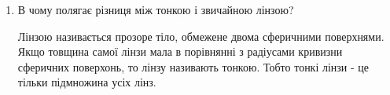 \begin{enumerate}
    \item В чому полягає різниця між тонкою і звичайною лінзою?
    \bigbreak

    Лінзою називається прозоре тіло, обмежене двома сферичними поверхнями.
    Якщо товщина самої лінзи мала в порівнянні з радіусами кривизни 
    сферичних поверхонь, то лінзу називають тонкою. Тобто тонкі лінзи - це тільки
    підмножина усіх лінз.

\end{enumerate}